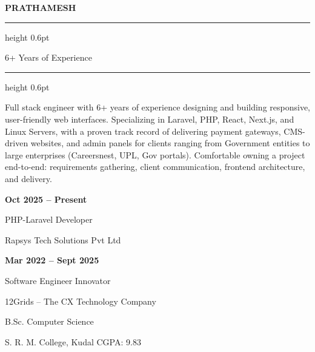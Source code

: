 \documentclass[letterpaper,10.5pt]{article}
\newcommand{\sectiontitle}[1]{%
  \par\vspace{10pt}{\large\bfseries #1}\vspace{5pt}\par
}
\newcommand{\subdate}[1]{{\bfseries #1}\par\vspace{2pt}}
\begin{document}
\begin{minipage}[t]{0.62\textwidth}
  {\fontsize{34}{38}\selectfont\bfseries PRATHAMESH}\\[2pt]
\end{minipage}
\hfill
\begin{minipage}[t]{0.36\textwidth}
  \vspace{6pt}
  \raggedleft
\end{minipage}

\vspace{8pt}
{\color{linegray}\hrule height 0.6pt}
\vspace{6pt}
\small 6+ Years of Experience
\vspace{4pt}
\par
{\color{linegray}\hrule height 0.6pt}

\sectiontitle{PROFESSIONAL SUMMARY}
\small
Full stack engineer with 6+ years of experience designing and building responsive, user-friendly web interfaces. Specializing in Laravel, PHP, React, Next.js, and Linux Servers, with a proven track record of delivering payment gateways, CMS-driven websites, and admin panels for clients ranging from Government entities to large enterprises (Careersnest, UPL, Gov portals). Comfortable owning a project end-to-end: requirements gathering, client communication, frontend architecture, and delivery. 
\sectiontitle{PROFESSIONAL EXPERIENCE}

\subdate{Oct 2025 -- Present}
\small PHP-Laravel Developer\par
\small Rapsys Tech Solutions Pvt Ltd
\vspace{8pt}

\subdate{Mar 2022 -- Sept 2025}
\small Software Engineer Innovator\par
\small 12Grids -- The CX Technology Company

\sectiontitle{EDUCATIONAL QUALIFICATIONS}

\small B.Sc. Computer Science\par
\small S. R. M. College, Kudal \hspace{4pt} \textbullet\hspace{4pt} CGPA: 9.83
\vspace{8pt}
\end{document}
